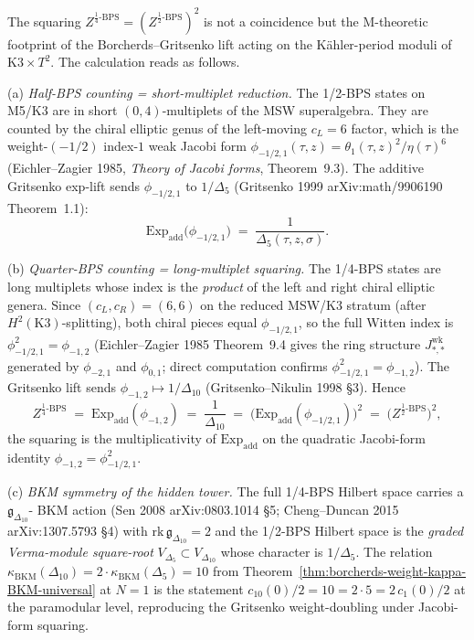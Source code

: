 \begin{remark}
\label{rem:cy-c-beyond-k3e-m5-k3-hidden-bps-tower-squaring}
The squaring
$Z^{\tfrac14\text{-BPS}} = (Z^{\tfrac12\text{-BPS}})^2$
is not a coincidence but the M-theoretic footprint of the
Borcherds--Gritsenko lift acting on the K\"ahler-period moduli of
$\mathrm{K3}\times T^2$. The calculation reads as follows.

\textup{(a)} \emph{Half-BPS counting = short-multiplet reduction.}
The 1/2-BPS states on M5/K3 are in short $(0,4)$-multiplets of the
MSW superalgebra. They are counted by the chiral elliptic genus of
the left-moving $c_L=6$ factor, which is the weight-$(-1/2)$
index-$1$ weak Jacobi form $\phi_{-1/2,1}(\tau,z) = \theta_1(\tau,z)^2/\eta(\tau)^6$
(Eichler--Zagier 1985, \emph{Theory of Jacobi forms}, Theorem~9.3).
The additive Gritsenko exp-lift sends $\phi_{-1/2,1}$ to
$1/\Delta_5$ (Gritsenko 1999 arXiv:math/9906190 Theorem~1.1):
\[
 \mathrm{Exp}_{\mathrm{add}}\bigl(\phi_{-1/2,1}\bigr)
 \;=\; \frac{1}{\Delta_5(\tau,z,\sigma)}.
\]

\textup{(b)} \emph{Quarter-BPS counting = long-multiplet squaring.}
The 1/4-BPS states are long multiplets whose index is the
\emph{product} of the left and right chiral elliptic genera.
Since $(c_L,c_R)=(6,6)$ on the reduced MSW/K3 stratum (after
$H^2(\mathrm K3)$-splitting), both chiral pieces equal
$\phi_{-1/2,1}$, so the full Witten index is
$\phi_{-1/2,1}^2 = \phi_{-1,2}$ (Eichler--Zagier 1985 Theorem~9.4
gives the ring structure $J^{\mathrm{wk}}_{*,*}$ generated by
$\phi_{-2,1}$ and $\phi_{0,1}$; direct computation confirms
$\phi_{-1/2,1}^2 = \phi_{-1,2}$). The Gritsenko lift sends
$\phi_{-1,2}\mapsto 1/\Delta_{10}$ (Gritsenko--Nikulin 1998 \S 3).
Hence
\[
 Z^{\tfrac14\text{-BPS}}
 \;=\; \mathrm{Exp}_{\mathrm{add}}(\phi_{-1,2})
 \;=\; \frac{1}{\Delta_{10}}
 \;=\; \bigl(\mathrm{Exp}_{\mathrm{add}}(\phi_{-1/2,1})\bigr)^2
 \;=\; \bigl(Z^{\tfrac12\text{-BPS}}\bigr)^2,
\]
the squaring is the multiplicativity of $\mathrm{Exp}_{\mathrm{add}}$
on the quadratic Jacobi-form identity $\phi_{-1,2}=\phi_{-1/2,1}^2$.

\textup{(c)} \emph{BKM symmetry of the hidden tower.}
The full 1/4-BPS Hilbert space carries a $\mathfrak g_{\Delta_{10}}$-
BKM action (Sen 2008 arXiv:0803.1014 \S 5; Cheng--Duncan 2015
arXiv:1307.5793 \S 4) with $\mathrm{rk}\,\mathfrak g_{\Delta_{10}} = 2$
and the 1/2-BPS Hilbert space is the \emph{graded Verma-module
square-root} $V_{\Delta_5}\subset V_{\Delta_{10}}$ whose character is
$1/\Delta_5$. The relation
$\kappa_{\mathrm{BKM}}(\Delta_{10}) = 2\cdot\kappa_{\mathrm{BKM}}(\Delta_5) = 10$
from
\cite{VolI}
Theorem~\ref{thm:borcherds-weight-kappa-BKM-universal} at $N=1$
is the statement $c_{10}(0)/2 = 10 = 2\cdot 5 = 2\,c_1(0)/2$ at the
paramodular level, reproducing the Gritsenko weight-doubling under
Jacobi-form squaring.


\end{remark}
